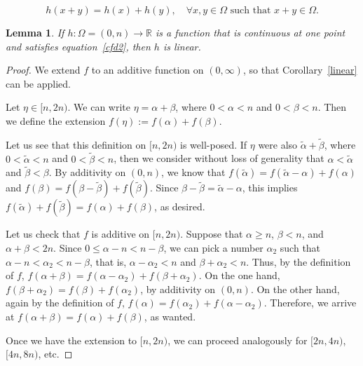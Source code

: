 \documentclass[10pt,a4paper]{amsart}
\newtheorem{lemma}{Lemma}
\begin{document}
\begin{equation} h(x+y)=h(x)+h(y),\quad \forall x,y\in\Omega\text{ such that }x+y\in\Omega. 
\label{cfd2}
\end{equation}

\begin{lemma} \label{cfr}
If $h:\Omega=(0,n)\rightarrow\mathbb{R}$ is a function that is continuous at one point and satisfies equation~\eqref{cfd2}, then $h$ is linear.
\end{lemma}

\begin{proof}
We extend $f$ to an additive function on $(0,\infty)$, so that Corollary~\ref{linear} can be applied.

Let $\eta\in [n,2n)$. We can write $\eta=\alpha+\beta$, where $0<\alpha<n$ and $0<\beta<n$. Then we define the extension $f(\eta):=f(\alpha)+f(\beta)$.

Let us see that this definition on $[n,2n)$ is well-posed. If $\eta$ were also $\tilde{\alpha}+\tilde{\beta}$, where $0<\tilde{\alpha}<n$ and $0<\tilde{\beta}<n$, then we consider without loss of generality that $\alpha<\tilde{\alpha}$ and $\tilde{\beta}<\beta$. By additivity on $(0,n)$, we know that $f(\tilde{\alpha})=f(\tilde{\alpha}-\alpha)+f(\alpha)$ and $f(\beta)=f(\beta-\tilde{\beta})+f(\tilde{\beta})$. Since $\beta-\tilde{\beta}=\tilde{\alpha}-\alpha$, this implies $f(\tilde{\alpha})+f(\tilde{\beta})=f(\alpha)+f(\beta)$, as desired.

Let us check that $f$ is additive on $[n,2n)$. Suppose that $\alpha\geq n$, $\beta<n$, and $\alpha+\beta<2n$. Since $0\leq \alpha-n<n-\beta$, we can pick a number $\alpha_2$ such that $\alpha-n<\alpha_2<n-\beta$, that is, $\alpha-\alpha_2<n$ and $\beta+\alpha_2<n$. Thus, by the definition of $f$, $f(\alpha+\beta)=f(\alpha-\alpha_2)+f(\beta+\alpha_2)$. On the one hand, $f(\beta+\alpha_2)=f(\beta)+f(\alpha_2)$, by additivity on $(0,n)$. On the other hand, again by the definition of $f$, $f(\alpha)=f(\alpha_2)+f(\alpha-\alpha_2)$. Therefore, we arrive at $f(\alpha+\beta)=f(\alpha)+f(\beta)$, as wanted.

Once we have the extension to $[n,2n)$, we can proceed analogously for $[2n,4n)$, $[4n,8n)$, etc.
\end{proof}
\end{document}
